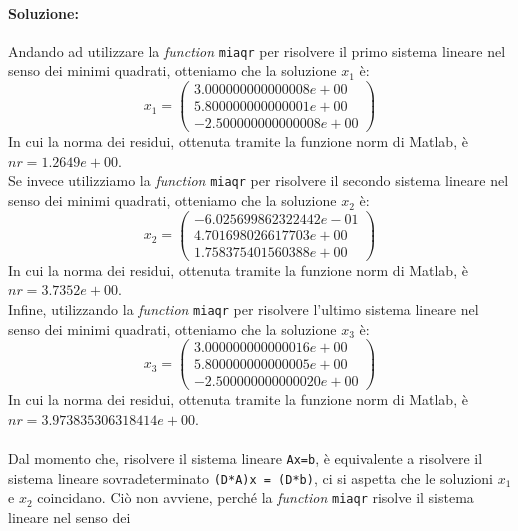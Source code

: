 \documentclass[12pt]{article}
\begin{document}
\paragraph{Soluzione:}
Andando ad utilizzare la \textit{function} \texttt{miaqr} per risolvere il primo sistema lineare nel senso dei minimi quadrati, otteniamo che la soluzione \(x_1\) è:
\begin{equation*} x_1=
    \begin{pmatrix}
        3.000000000000008e+00\\
        5.800000000000001e+00\\
        -2.500000000000008e+00
    \end{pmatrix}
\end{equation*}
In cui la norma dei residui, ottenuta tramite la funzione norm di Matlab, è \(nr=1.2649e+00\). \\
Se invece utilizziamo la \textit{function} \texttt{miaqr} per risolvere il secondo sistema lineare nel senso dei minimi quadrati, otteniamo che la soluzione \(x_2\) è:
\begin{equation*} x_2=
    \begin{pmatrix}
        -6.025699862322442e-01\\
        4.701698026617703e+00\\
        1.758375401560388e+00
    \end{pmatrix}
\end{equation*}
In cui la norma dei residui, ottenuta tramite la funzione norm di Matlab, è \(nr=3.7352e+00\). \\
Infine, utilizzando la \textit{function} \texttt{miaqr} per risolvere l'ultimo sistema lineare nel senso dei minimi quadrati, otteniamo che la soluzione \(x_3\) è:
\begin{equation*} x_3=
    \begin{pmatrix}
        3.000000000000016e+00\\
        5.800000000000005e+00\\
        -2.500000000000020e+00
    \end{pmatrix}
\end{equation*}
In cui la norma dei residui, ottenuta tramite la funzione norm di Matlab, è \(nr=3.973835306318414e+00\). \\ \\
Dal momento che, risolvere il sistema lineare \texttt{Ax=b}, è equivalente a risolvere il sistema lineare
sovradeterminato \texttt{(D*A)x = (D*b)}, ci si aspetta che le soluzioni \(x_1\) e \(x_2\) coincidano.
Ciò non avviene, perché la \textit{function} \texttt{miaqr} risolve il sistema lineare nel senso dei 
\end{document}
